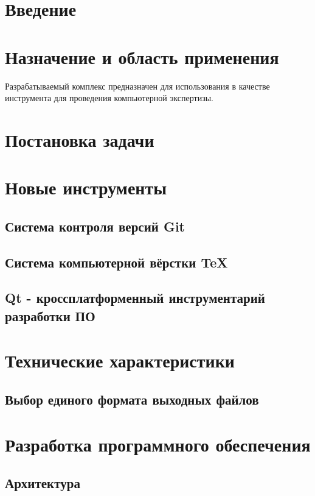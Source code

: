 \documentclass[russian,utf8,14pt,simple]{eskdtext}
\begin{document}
\newpage
{}
\section{Введение}


\section{Назначение и область применения}
Разрабатываемый комплекс предназначен для использования в качестве инструмента для проведения компьютерной экспертизы.
\section{Постановка задачи}
\setcounter{figure}{0}

\section{Новые инструменты}
\setcounter{figure}{0}
\subsection{Система контроля версий Git}

\subsection{Система компьютерной вёрстки \TeX}

\subsection{Qt - кроссплатформенный инструментарий разработки ПО}


\section{Технические характеристики}

\subsection{Выбор единого формата выходных файлов}


\section{Разработка программного обеспечения}
\setcounter{figure}{0}

\subsection{Архитектура}

\end{document}
